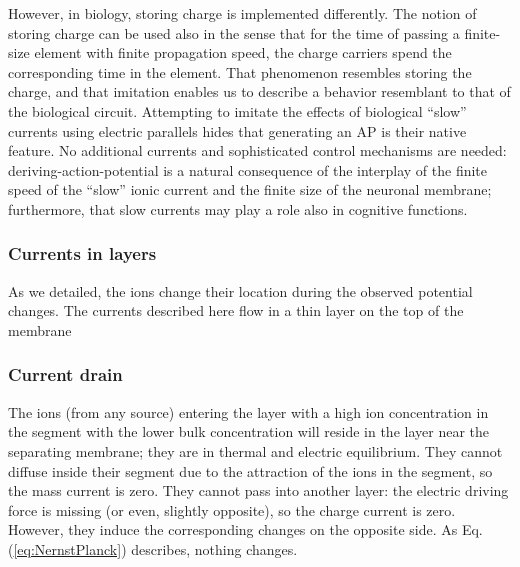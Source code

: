 However, %
in biology, storing charge is implemented differently.
The notion of storing charge can be used also in the sense that
for the time of passing a finite-size element with finite propagation speed,
the charge carriers spend the corresponding time in the element.
That phenomenon resembles storing the charge, and that imitation enables us
to describe a behavior resemblant to that of the biological circuit.
Attempting to imitate the effects of biological “slow” currents using electric parallels
hides that generating an 
\gls{AP}
is their native feature.
No additional currents and sophisticated control mechanisms are needed:
deriving-action-potential
is a natural consequence
of the interplay of the finite speed
of the “slow” ionic current and the finite size of the neuronal membrane;
furthermore, that slow currents may play a role also in cognitive functions.


\subsubsection[In layers]{Currents in layers\label{sec:Physics-ElectrolyteLayers}}

As we detailed, the ions change their location during
the observed potential changes.
The currents described here flow in a thin layer on the top of the membrane


\subsubsection[Drain]{Current drain\label{sec:Physics-CurrentDrain}}

The ions (from any source) entering the layer with a high ion concentration
in the segment with the lower bulk concentration will reside in the
layer near the separating membrane; they are in thermal and electric
equilibrium. They cannot diffuse inside their segment due to the attraction
of the ions in the segment, so the mass current is zero. They cannot
pass into another layer: the electric driving force is missing (or even, slightly opposite), so
the charge current is zero. However, they induce the corresponding
changes on the opposite side. As Eq.(\ref{eq:NernstPlanck}) describes,
nothing changes. 

